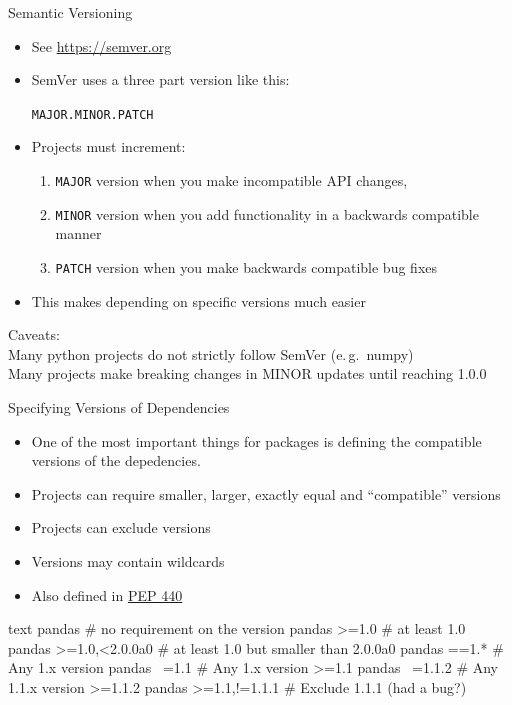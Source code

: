 \documentclass[
  aspectratio=1610,
]{beamer}
\begin{document}
\begin{frame}[c]{Semantic Versioning}
  \begin{itemize}
    \item See \url{https://semver.org}

    \item SemVer uses a three part version like this:
      \begin{center}
        \Large\texttt{MAJOR.MINOR.PATCH}
      \end{center}
    \item Projects must increment:
      \begin{enumerate}
        \item \texttt{MAJOR} version when you make incompatible API changes,
        \item \texttt{MINOR} version when you add functionality in a backwards compatible manner
        \item \texttt{PATCH} version when you make backwards compatible bug fixes
      \end{enumerate}
    \item This makes depending on specific versions much easier
  \end{itemize}

  \bigskip
  \begin{center}
    Caveats:\\
    Many python projects do not strictly follow SemVer (e.\,g.\ numpy) \\
    Many projects make breaking changes in MINOR updates until reaching 1.0.0
  \end{center}
\end{frame}

\begin{frame}[fragile, c]{Specifying Versions of Dependencies}
  \begin{itemize}
    \item One of the most important things for packages is defining the compatible versions
  of the depedencies.
    \item Projects can require smaller, larger, exactly equal and \enquote{compatible} versions
    \item Projects can exclude versions
    \item Versions may contain wildcards
    \item Also defined in \href{https://www.python.org/dev/peps/pep-0440/#version-specifiers}{PEP 440}
  \end{itemize}

  \begin{code}[title={Depedency defintions}]{text}
     pandas                 # no requirement on the version
     pandas >=1.0           # at least 1.0
     pandas >=1.0,<2.0.0a0  # at least 1.0 but smaller than 2.0.0a0
     pandas ==1.*           # Any 1.x version
     pandas ~=1.1           # Any 1.x version >=1.1
     pandas ~=1.1.2         # Any 1.1.x version >=1.1.2
     pandas >=1.1,!=1.1.1   # Exclude 1.1.1 (had a bug?)
  \end{code}
\end{frame}
\end{document}
